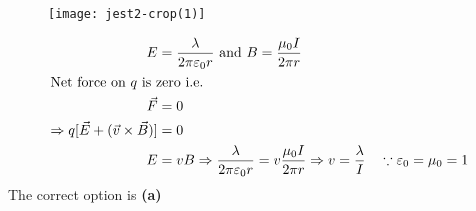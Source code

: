 \begin{enumerate}
\begin{answer}
\begin{figure}[H]
			\centering
			\texttt{[image: jest2-crop(1)]}
		\end{figure}
	\begin{align*}
		E&=\frac{\lambda}{2 \pi \varepsilon_{0} r} \text { and } B=\frac{\mu_{0} I}{2 \pi r}\\
	\intertext{Net force on  $q$ is zero i.e.}
	\vec{F}&=0\\
	\Rightarrow q[\vec{E}+(\vec{v} \times \vec{B})]&=0\\
	E&=v B \Rightarrow \frac{\lambda}{2 \pi \varepsilon_{0} r}=v \frac{\mu_{0} I}{2 \pi r} \Rightarrow v=\frac{\lambda}{I} \quad \because \varepsilon_{0}=\mu_{0}=1
	\end{align*}
The correct option is \textbf{(a)}	
	\end{answer}
\end{enumerate}